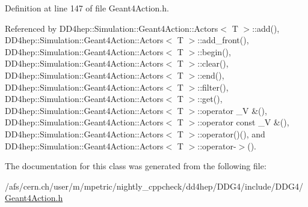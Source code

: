 Definition at line 147 of file Geant4Action.h.

Referenced by DD4hep::Simulation::Geant4Action::Actors$<$ T $>$::add(), DD4hep::Simulation::Geant4Action::Actors$<$ T $>$::add\_\-front(), DD4hep::Simulation::Geant4Action::Actors$<$ T $>$::begin(), DD4hep::Simulation::Geant4Action::Actors$<$ T $>$::clear(), DD4hep::Simulation::Geant4Action::Actors$<$ T $>$::end(), DD4hep::Simulation::Geant4Action::Actors$<$ T $>$::filter(), DD4hep::Simulation::Geant4Action::Actors$<$ T $>$::get(), DD4hep::Simulation::Geant4Action::Actors$<$ T $>$::operator \_\-V \&(), DD4hep::Simulation::Geant4Action::Actors$<$ T $>$::operator const \_\-V \&(), DD4hep::Simulation::Geant4Action::Actors$<$ T $>$::operator()(), and DD4hep::Simulation::Geant4Action::Actors$<$ T $>$::operator-\/$>$().

The documentation for this class was generated from the following file:\begin{DoxyCompactItemize}
\item 
/afs/cern.ch/user/m/mpetric/nightly\_\-cppcheck/dd4hep/DDG4/include/DDG4/\hyperlink{_geant4_action_8h}{Geant4Action.h}\end{DoxyCompactItemize}
